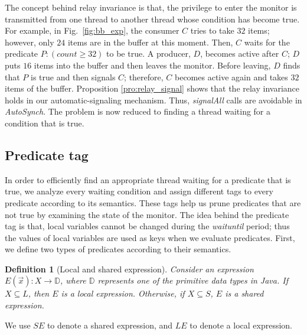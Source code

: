 \documentclass{sigplanconf}
\newtheorem{definition}{Definition}
\begin{document}
The concept behind relay invariance is that, the privilege to enter the monitor
is transmitted from one thread to another thread whose condition has become true. 
For example, in Fig.~\ref{fig:bb_exp}, the consumer $C$ tries to take
$32$ items; however, only $24$ items are in the buffer at this moment. Then, $C$
waits for the predicate $P:  (count \ge 32)$ to be true. A producer, $D$, becomes 
active after 
$C$; $D$ puts $16$ items into the buffer and then leaves the monitor. Before 
leaving, $D$ finds that $P$ is true and then signals $C$; therefore, $C$ 
becomes active again and takes $32$ items of the buffer.
Proposition \ref{pro:relay_signal} shows that the relay
invariance holds in our automatic-signaling mechanism. 
Thus, {\em signalAll} calls are avoidable in {\em AutoSynch}. 
The problem is now reduced to finding a thread waiting for a condition that is 
true. 

\subsection{Predicate tag} \label{sec:tag}
In order to efficiently find an appropriate thread waiting for a predicate that is
true, we analyze every waiting condition and assign different tags 
to every predicate according to its semantics. These  tags
help us prune predicates that are not true by examining the state 
of the monitor. The idea behind the predicate tag is that, local variables cannot be
changed during the {\em waituntil} period; thus the values of local variables are
used as keys when we evaluate predicates. 
First, we define two types of 
predicates according to their semantics. 
\begin{definition}[Local and shared expression]
    Consider an expression $E(\vec{x}): X \rightarrow \mathbb{D}$, where
    $\mathbb{D}$ represents one of the primitive data types in Java. If $X
    \subseteq L$, then $E$ is a local expression. Otherwise, 
    if $X \subseteq S$, $E$ is a shared expression.  
\end{definition}
We use $SE$ to denote a shared expression, and $LE$ to denote a local 
expression.
\end{document}
